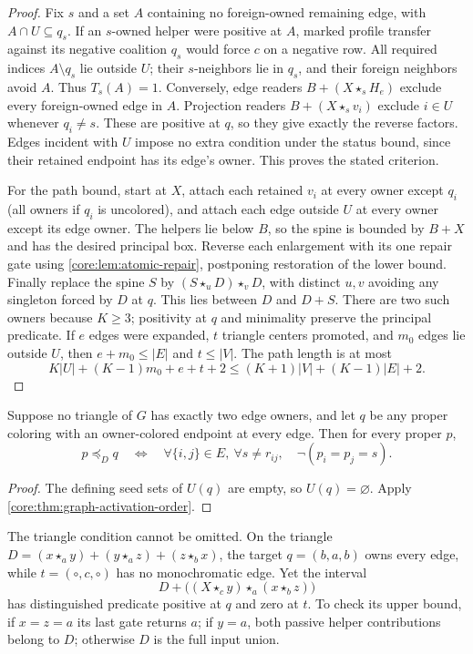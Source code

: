 \begin{proof}
Fix $s$ and a set $A$ containing no foreign-owned remaining edge,
with $A\cap U\subseteq q_s$. If an $s$-owned helper were positive
at $A$, marked profile transfer against its negative coalition
$q_s$ would force $c$ on a negative row. All required indices
$A\setminus q_s$ lie outside $U$; their $s$-neighbors lie in
$q_s$, and their foreign neighbors avoid $A$. Thus $T_s(A)=1$.
Conversely, edge readers $B+(X\star_s H_e)$ exclude every
foreign-owned edge in $A$. Projection readers
$B+(X\star_s v_i)$ exclude $i\in U$ whenever $q_i\ne s$.
These are positive at $q$, so they give exactly the reverse factors.
Edges incident with $U$ impose no extra condition under the
status bound, since their retained endpoint has its edge's owner.
This proves the stated criterion.

For the path bound, start at $X$, attach each retained $v_i$ at
every owner except $q_i$ (all owners if $q_i$ is uncolored), and
attach each edge outside $U$ at every owner except its edge owner.
The helpers lie below $B$, so the spine is bounded by $B+X$ and
has the desired principal box. Reverse each enlargement with its
one repair gate using \cref{core:lem:atomic-repair}, postponing
restoration of the lower bound. Finally replace the spine $S$ by
$(S\star_uD)\star_vD$, with distinct $u,v$ avoiding any singleton
forced by $D$ at $q$. This lies between $D$ and $D+S$.
There are two such owners because $K\geq3$; positivity at $q$
and minimality preserve the principal predicate.
If $e$ edges were expanded, $t$ triangle centers promoted, and
$m_0$ edges lie outside $U$, then $e+m_0\leq|E|$ and $t\leq|V|$.
The path length is at most
\[
 K|U|+(K-1)m_0+e+t+2
 \leq (K+1)|V|+(K-1)|E|+2.
\]
\end{proof}

\begin{corollary}
\label{core:thm:graph-owning-activation}
Suppose no triangle of $G$ has exactly two edge owners, and let
$q$ be any proper coloring with an owner-colored endpoint at every
edge. Then for every proper $p$,
\[
 p\preceq_Dq\quad\Longleftrightarrow\quad
 \forall\{i,j\}\in E,\ \forall s\ne r_{ij},\quad
 \neg(p_i=p_j=s).
\]
\end{corollary}
\begin{proof}
The defining seed sets of $U(q)$ are empty, so $U(q)=\varnothing$.
Apply \cref{core:thm:graph-activation-order}.
\end{proof}

The triangle condition cannot be omitted. On the triangle
$D=(x\star_a y)+(y\star_a z)+(z\star_b x)$, the target
$q=(b,a,b)$ owns every edge, while $t=(\circ,c,\circ)$ has no
monochromatic edge. Yet the interval
\[
 D+\bigl((X\star_c y)\star_a(x\star_b z)\bigr)
\]
has distinguished predicate positive at $q$ and zero at $t$.
To check its upper bound, if
$x=z=a$ its last gate returns $a$; if $y=a$, both passive helper
contributions belong to $D$; otherwise $D$ is the full input union.


